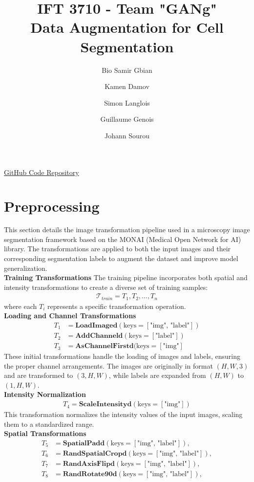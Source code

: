 \documentclass[]{article}
\title{\textbf{IFT 3710 - Team "GANg"} \\ 
\textbf{Data Augmentation for Cell Segmentation}}
\author[1]{Bio Samir Gbian}
\author[1]{Kamen Damov}
\author[1]{Simon Langlois}
\author[1]{Guillaume Genois}
\author[1]{Johann Sourou}
\affil{Departement of Computer Science and Operations Research}
\affil[1]{University of Montreal}
\begin{document}
\maketitle

\href{https://github.com/KamenDamov/IFT3710-Advanced-Project-in-ML-AI}{GitHub Code Repository}

\section{Preprocessing}
This section details the image transformation pipeline used in a microscopy image segmentation framework based on the MONAI (Medical Open Network for AI) library. The transformations are applied to both the input images and their corresponding segmentation labels to augment the dataset and improve model generalization.\\
\textbf{Training Transformations}
The training pipeline incorporates both spatial and intensity transformations to create a diverse set of training samples:
\begin{align}
    \mathcal{T}_{train} = {T_1, T_2, \ldots, T_n}
\end{align}
where each $T_i$ represents a specific transformation operation.\\
\textbf{Loading and Channel Transformations}
\begin{align}
T_1 &= \textbf{LoadImaged}(\text{keys}=[\text{"img", "label"}]) \\
T_2 &= \textbf{AddChanneld}(\text{keys}=[\text{"label"}]) \\
T_3 &= \textbf{AsChannelFirstd}(\text{keys}=[\text{"img"}]
\end{align}
These initial transformations handle the loading of images and labels, ensuring the proper channel arrangements. The images are originally in format $(H, W, 3)$ and are transformed to $(3, H, W)$, while labels are expanded from $(H, W)$ to $(1, H, W)$.\\
\textbf{Intensity Normalization}
\begin{align}
    T_4 = \textbf{ScaleIntensityd}(\text{keys}=[\text{"img"}])
\end{align}
This transformation normalizes the intensity values of the input images, scaling them to a standardized range.\\
\textbf{Spatial Transformations}
\begin{align}
    T_5 &= \textbf{SpatialPadd}(\text{keys}=[\text{"img", "label"}]),\\ %
    T_6 &= \textbf{RandSpatialCropd}(\text{keys}=[\text{"img", "label"}]),\\ %
    T_7 &= \textbf{RandAxisFlipd}(\text{keys}=[\text{"img", "label"}]),\\ %
    T_8 &= \textbf{RandRotate90d}(\text{keys}=[\text{"img", "label"}]), %
\end{align}
\end{document}
